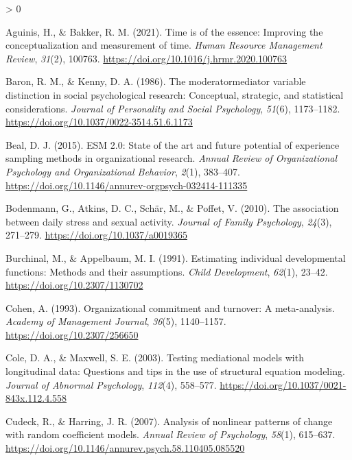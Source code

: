 \documentclass[
12pt, %
twoside,
english]{guelphthesis}
\newlength{\cslhangindent}
\newenvironment{CSLReferences}[2] %
 {%
  \setlength{\parindent}{0pt}
  \ifodd #1 \everypar{\setlength{\hangindent}{\cslhangindent}}\ignorespaces\fi
  \ifnum #2 > 0
  \setlength{\parskip}{\linespacing{2}}
  \fi
 }%
 {}
\begin{document}
\hypertarget{refs}{}
\begin{CSLReferences}{1}{0}
\leavevmode{}%
Aguinis, H., \& Bakker, R. M. (2021). Time is of the essence: Improving the conceptualization and measurement of time. \emph{Human Resource Management Review}, \emph{31}(2), 100763. \url{https://doi.org/10.1016/j.hrmr.2020.100763}

\leavevmode{}%
Baron, R. M., \& Kenny, D. A. (1986). The moderator{\textendash}mediator variable distinction in social psychological research: Conceptual, strategic, and statistical considerations. \emph{Journal of Personality and Social Psychology}, \emph{51}(6), 1173--1182. \url{https://doi.org/10.1037/0022-3514.51.6.1173}

\leavevmode{}%
Beal, D. J. (2015). ESM 2.0: State of the art and future potential of experience sampling methods in organizational research. \emph{Annual Review of Organizational Psychology and Organizational Behavior}, \emph{2}(1), 383--407. \url{https://doi.org/10.1146/annurev-orgpsych-032414-111335}

\leavevmode{}%
Bodenmann, G., Atkins, D. C., Schär, M., \& Poffet, V. (2010). The association between daily stress and sexual activity. \emph{Journal of Family Psychology}, \emph{24}(3), 271--279. \url{https://doi.org/10.1037/a0019365}

\leavevmode{}%
Burchinal, M., \& Appelbaum, M. I. (1991). Estimating individual developmental functions: Methods and their assumptions. \emph{Child Development}, \emph{62}(1), 23--42. \url{https://doi.org/10.2307/1130702}

\leavevmode{}%
Cohen, A. (1993). Organizational commitment and turnover: A meta-analysis. \emph{Academy of Management Journal}, \emph{36}(5), 1140--1157. \url{https://doi.org/10.2307/256650}

\leavevmode{}%
Cole, D. A., \& Maxwell, S. E. (2003). Testing mediational models with longitudinal data: Questions and tips in the use of structural equation modeling. \emph{Journal of Abnormal Psychology}, \emph{112}(4), 558--577. \url{https://doi.org/10.1037/0021-843x.112.4.558}

\leavevmode{}%
Cudeck, R., \& Harring, J. R. (2007). Analysis of nonlinear patterns of change with random coefficient models. \emph{Annual Review of Psychology}, \emph{58}(1), 615--637. \url{https://doi.org/10.1146/annurev.psych.58.110405.085520}


\end{CSLReferences}
\end{document}
